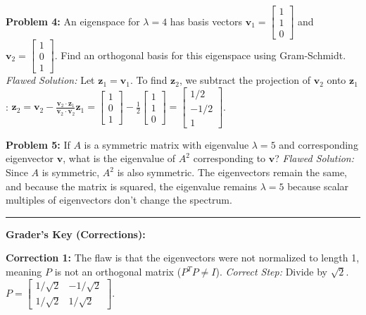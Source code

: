 \documentclass[11pt, letterpaper]{article}
\theoremstyle{definition}
\theoremstyle{remark}
\begin{document}
\textbf{Problem 4:} An eigenspace for $\lambda = 4$ has basis vectors $\mathbf{v}_1 = \begin{bmatrix} 1 \\ 1 \\ 0 \end{bmatrix}$ and $\mathbf{v}_2 = \begin{bmatrix} 1 \\ 0 \\ 1 \end{bmatrix}$. Find an orthogonal basis for this eigenspace using Gram-Schmidt.
\textit{Flawed Solution:}
Let $\mathbf{z}_1 = \mathbf{v}_1$.
To find $\mathbf{z}_2$, we subtract the projection of $\mathbf{v}_2$ onto $\mathbf{z}_1$:
$\mathbf{z}_2 = \mathbf{v}_2 - \frac{\mathbf{v}_2 \cdot \mathbf{z}_1}{\mathbf{v}_2 \cdot \mathbf{v}_2} \mathbf{z}_1 = \begin{bmatrix} 1 \\ 0 \\ 1 \end{bmatrix} - \frac{1}{2} \begin{bmatrix} 1 \\ 1 \\ 0 \end{bmatrix} = \begin{bmatrix} 1/2 \\ -1/2 \\ 1 \end{bmatrix}$.

\textbf{Problem 5:} If $A$ is a symmetric matrix with eigenvalue $\lambda = 5$ and corresponding eigenvector $\mathbf{v}$, what is the eigenvalue of $A^2$ corresponding to $\mathbf{v}$?
\textit{Flawed Solution:}
Since $A$ is symmetric, $A^2$ is also symmetric. The eigenvectors remain the same, and because the matrix is squared, the eigenvalue remains $\lambda = 5$ because scalar multiples of eigenvectors don't change the spectrum.

\vspace{2em}
\hrule
\vspace{1em}
\textbf{Grader's Key (Corrections):}

\textbf{Correction 1:} The flaw is that the eigenvectors were not normalized to length 1, meaning $P$ is not an orthogonal matrix ($P^T P \neq I$). 
\textit{Correct Step:} Divide by $\sqrt{2}$. $P = \begin{bmatrix} 1/\sqrt{2} & -1/\sqrt{2} \\ 1/\sqrt{2} & 1/\sqrt{2} \end{bmatrix}$.
\end{document}
